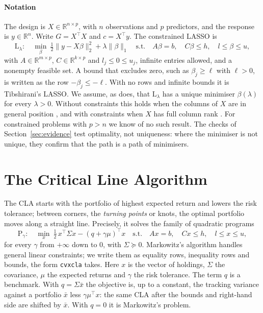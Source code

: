 \documentclass[11pt]{article}
\theoremstyle{remark}
\newcommand{\trans}{^{\top}}
\newcommand{\Sig}{\Sigma}
\newcommand{\R}{\mathbb{R}}
\begin{document}
\paragraph{Notation} The design is $X\in\R^{n\times p}$, with $n$ observations and $p$
predictors, and the response is $y\in\R^n$. Write $G=X\trans X$ and $c=X\trans y$. The
constrained LASSO is
\begin{equation}
\label{eq:lasso}
\mathrm{L}_\lambda:\quad
\min_\beta\ \tfrac12\|y-X\beta\|_2^2+\lambda\|\beta\|_1
\quad\text{s.t.}\quad A\beta=b,\quad C\beta\le h,\quad l\le\beta\le u,
\end{equation}
with $A\in\R^{m\times p}$, $C\in\R^{k\times p}$ and $l_j\le0\le u_j$, infinite
entries allowed, and a nonempty feasible set. A bound that excludes zero, such as
$\beta_j\ge\ell$ with $\ell>0$, is written as the row $-\beta_j\le-\ell$. With no rows
and infinite bounds it is Tibshirani's LASSO. We assume,
as \cite{perspective} does, that $\mathrm{L}_\lambda$ has a unique minimiser
$\beta(\lambda)$ for every $\lambda>0$. Without constraints this holds when the columns
of $X$ are in general position \cite{tibshirani2013}, and with constraints when $X$ has
full column rank \cite[Theorem~6]{hobson2026}. For constrained problems with $p>n$ we
know of no such result. The checks of Section~\ref{sec:evidence} test optimality, not
uniqueness: where the minimiser is not unique, they confirm that the path is a path of
minimisers.

\section{The Critical Line Algorithm}
\label{sec:cla}

The CLA starts with the portfolio of highest expected return and lowers the risk
tolerance; between corners, the \emph{turning points} or knots, the optimal portfolio
moves along a straight line. Precisely, it solves the family of quadratic programs
\begin{equation}
\label{eq:cla}
\mathrm{P}_\gamma:\quad
\min_x\ \tfrac12\,x\trans\Sig x-(q+\gamma\mu)\trans x
\quad\text{s.t.}\quad Ax=b,\quad Cx\le h,\quad l\le x\le u,
\end{equation}
for every $\gamma$ from $+\infty$ down to $0$, with $\Sig\succeq0$. Markowitz's
algorithm \cite{markowitz1956} handles general linear constraints; we write them as
equality rows, inequality rows and bounds, the form \texttt{cvxcla} takes. Here $x$ is the
vector of holdings, $\Sig$ the covariance, $\mu$ the expected returns and $\gamma$ the
risk tolerance. The term $q$ is a benchmark. With $q=\Sig\bar x$ the objective is, up to
a constant, the tracking variance against a portfolio $\bar x$ less $\gamma\mu\trans x$:
the same CLA after the bounds and right-hand side are shifted by $\bar x$.
With $q=0$ it is Markowitz's problem.
\end{document}
